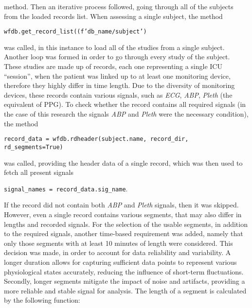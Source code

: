\noindent method.
Then an iterative process followed, going through all of the subjects from the loaded records list.
When assessing a single subject, the method

\vspace{0.1cm}
{\centering \texttt{wfdb.get\_record\_list((f'{db\_name}/{subject}')}\par}
\vspace{0.1cm}

\noindent was called, in this instance to load all of the studies from a single subject.
Another loop was formed in order to go through every study of the subject.
These studies are made up of records, each one representing a single ICU \enquote{session}, when the patient was linked up to at least one monitoring device, therefore they highly differ in time length.
Due to the diversity of monitoring devices, these records contain various signals, such as \textit{ECG}, \textit{ABP}, \textit{Pleth} (the equivalent of PPG).
To check whether the record contains all required signals (in the case of this research the signals \textit{ABP} and \textit{Pleth} were the necessary condition),
the method

\vspace{0.1cm}
{\centering \texttt{record\_data = wfdb.rdheader(subject.name, record\_dir, rd\_segments=True)}\par}
\vspace{0.1cm}

\noindent was called, providing the header data of a single record,
which was then used to fetch all present signals

\vspace{0.1cm}
{\centering \texttt{signal\_names = record\_data.sig\_name}.\par}
\vspace{0.1cm}

\noindent If the record did not contain both \textit{ABP} and \textit{Pleth} signals, then it was skipped.
However, even a single record contains various segments, that may also differ in lengths and recorded signals.
For the selection of the usable segments, in addition to the required signals, another time-based requirement was added, namely that only those segments with at least 10 minutes of length were considered.
This decision was made, in order to account for data reliability and variability.
A longer duration allows for capturing sufficient data points to represent various physiological states accurately, reducing the influence of short-term fluctuations.
Secondly, longer segments mitigate the impact of noise and artifacts, providing a more reliable and stable signal for analysis.
The length of a segment is calculated by the following function:

